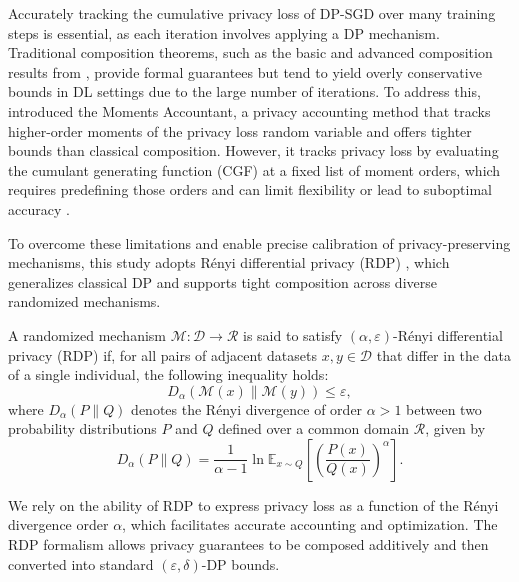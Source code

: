 Accurately tracking the cumulative privacy loss of DP-SGD over many training steps is essential, as each iteration involves applying a DP mechanism. Traditional composition theorems, such as the basic and advanced composition results from \citet{dwork2014algorithmic}, provide formal guarantees but tend to yield overly conservative bounds in DL settings due to the large number of iterations. To address this, \citet{abadi2016deep} introduced the Moments Accountant, a privacy accounting method that tracks higher-order moments of the privacy loss random variable and offers tighter bounds than classical composition. However, it tracks privacy loss by evaluating the cumulant generating function (CGF) at a fixed list of moment orders, which requires predefining those orders and can limit flexibility or lead to suboptimal accuracy \citep{wang2019subsampled}.

To overcome these limitations and enable precise calibration of privacy-preserving mechanisms, this study adopts Rényi differential privacy (RDP) \citep{mironov2017renyi}, which generalizes classical DP and supports tight composition across diverse randomized mechanisms.

\begin{definition}
A randomized mechanism $\mathcal{M} : \mathcal{D} \to \mathcal{R}$ is said to satisfy $(\alpha, \varepsilon)$-Rényi differential privacy (RDP) if, for all pairs of adjacent datasets $x, y \in \mathcal{D}$ that differ in the data of a single individual, the following inequality holds:
\[
D_{\alpha}(\mathcal{M}(x) \| \mathcal{M}(y)) \leq \varepsilon,
\]
where $D_{\alpha}(P \| Q)$ denotes the Rényi divergence of order $\alpha > 1$ between two probability distributions $P$ and $Q$ defined over a common domain $\mathcal{R}$, given by
\[
D_{\alpha}(P \| Q) = \frac{1}{\alpha - 1} \ln \mathbb{E}_{x \sim Q} \left[ \left( \frac{P(x)}{Q(x)} \right)^{\alpha} \right].
\]
\end{definition}

We rely on the ability of RDP to express privacy loss as a function of the Rényi divergence order $\alpha$, which facilitates accurate accounting and optimization. The RDP formalism allows privacy guarantees to be composed additively and then converted into standard $(\varepsilon, \delta)$-DP bounds.

